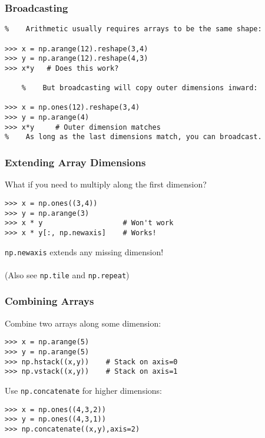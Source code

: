\begin{frame}[fragile]\frametitle{Broadcasting}

    \begin{lstlisting}
%    Arithmetic usually requires arrays to be the same shape:
	
>>> x = np.arange(12).reshape(3,4)
>>> y = np.arange(12).reshape(4,3)
>>> x*y   # Does this work?

	%    But broadcasting will copy outer dimensions inward:

>>> x = np.ones(12).reshape(3,4)
>>> y = np.arange(4)
>>> x*y     # Outer dimension matches
%    As long as the last dimensions match, you can broadcast.

    \end{lstlisting}
\end{frame}

\begin{frame}[fragile]\frametitle{Extending Array Dimensions}

    What if you need to multiply along the first dimension?
    \begin{lstlisting}
>>> x = np.ones((3,4))
>>> y = np.arange(3)
>>> x * y                   # Won't work
>>> x * y[:, np.newaxis]    # Works!
    \end{lstlisting}
    \lstinline|np.newaxis| extends any missing dimension!
    \\~\\
    (Also see \lstinline|np.tile| and \lstinline|np.repeat|)
\end{frame}

\begin{frame}[fragile]\frametitle{Combining Arrays}

    Combine two arrays along some dimension:
    \begin{lstlisting}
>>> x = np.arange(5)
>>> y = np.arange(5)
>>> np.hstack((x,y))    # Stack on axis=0
>>> np.vstack((x,y))    # Stack on axis=1
    \end{lstlisting}

    Use \lstinline|np.concatenate| for higher dimensions:
    \begin{lstlisting}
>>> x = np.ones((4,3,2))
>>> y = np.ones((4,3,1))
>>> np.concatenate((x,y),axis=2)
    \end{lstlisting}
\end{frame}

